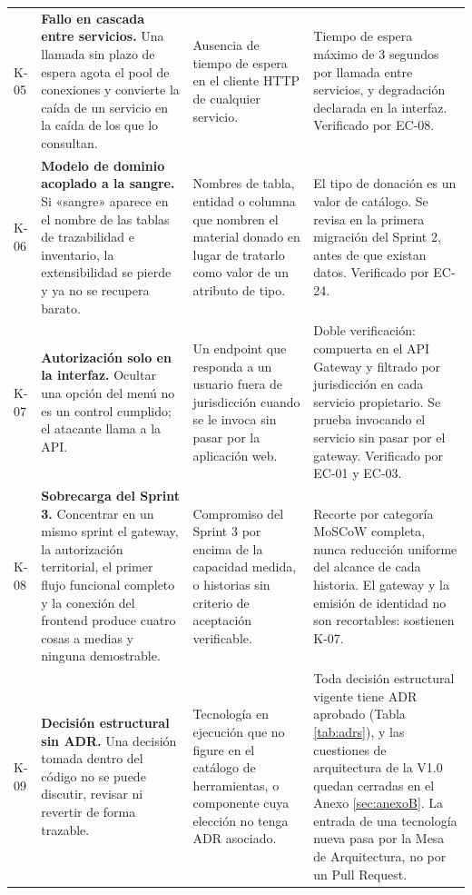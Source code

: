 \documentclass[11pt,a4paper]{article}
\begin{document}
\begin{longtable}{L{1.3cm} L{3.6cm} L{4.4cm} L{4.6cm}}
K-05 & \textbf{Fallo en cascada entre servicios.} Una llamada sin plazo de espera agota el pool de conexiones y convierte la caída de un servicio en la caída de los que lo consultan. & Ausencia de tiempo de espera en el cliente HTTP de cualquier servicio. & Tiempo de espera máximo de 3 segundos por llamada entre servicios, y degradación declarada en la interfaz. Verificado por EC-08. \\
K-06 & \textbf{Modelo de dominio acoplado a la sangre.} Si «sangre» aparece en el nombre de las tablas de trazabilidad e inventario, la extensibilidad se pierde y ya no se recupera barato. & Nombres de tabla, entidad o columna que nombren el material donado en lugar de tratarlo como valor de un atributo de tipo. & El tipo de donación es un valor de catálogo. Se revisa en la primera migración del Sprint 2, antes de que existan datos. Verificado por EC-24. \\
K-07 & \textbf{Autorización solo en la interfaz.} Ocultar una opción del menú no es un control cumplido; el atacante llama a la API. & Un endpoint que responda a un usuario fuera de jurisdicción cuando se le invoca sin pasar por la aplicación web. & Doble verificación: compuerta en el API Gateway y filtrado por jurisdicción en cada servicio propietario. Se prueba invocando el servicio sin pasar por el gateway. Verificado por EC-01 y EC-03. \\
K-08 & \textbf{Sobrecarga del Sprint 3.} Concentrar en un mismo sprint el gateway, la autorización territorial, el primer flujo funcional completo y la conexión del frontend produce cuatro cosas a medias y ninguna demostrable. & Compromiso del Sprint 3 por encima de la capacidad medida, o historias sin criterio de aceptación verificable. & Recorte por categoría MoSCoW completa, nunca reducción uniforme del alcance de cada historia. El gateway y la emisión de identidad no son recortables: sostienen K-07. \\
K-09 & \textbf{Decisión estructural sin ADR.} Una decisión tomada dentro del código no se puede discutir, revisar ni revertir de forma trazable. & Tecnología en ejecución que no figure en el catálogo de herramientas, o componente cuya elección no tenga ADR asociado. & Toda decisión estructural vigente tiene ADR aprobado (Tabla \ref{tab:adrs}), y las cuestiones de arquitectura de la V1.0 quedan cerradas en el Anexo \ref{sec:anexoB}. La entrada de una tecnología nueva pasa por la Mesa de Arquitectura, no por un Pull Request. \\
\end{longtable}
\end{document}
